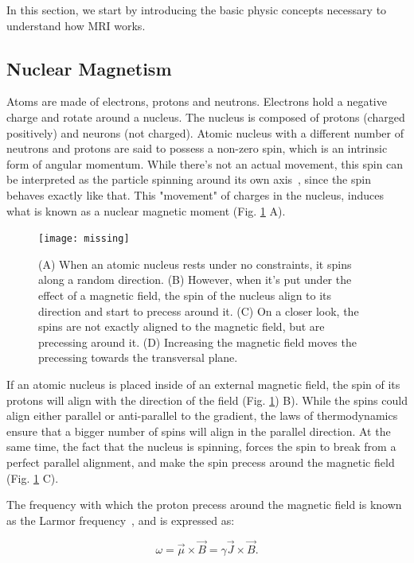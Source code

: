 In this section, we start by introducing the basic physic concepts necessary to
understand how MRI works.

\subsection{Nuclear Magnetism}

Atoms are made of electrons, protons and neutrons. Electrons hold a negative
charge and rotate around a nucleus. The nucleus is composed of protons (charged
positively) and neurons (not charged). Atomic nucleus with a different number of
neutrons and protons are said to possess a non-zero spin, which is an intrinsic
form of angular momentum. While there's not an actual movement, this spin can be
interpreted as the particle spinning around its own axis~\cite{SEGALA1993},
since the spin behaves exactly like that. This "movement" of charges in the nucleus,
induces what is known as a nuclear magnetic moment (Fig. \ref{fig:spin} A).

\begin{figure}[h]
    \texttt{[image: missing]}
    \caption{(A) When an atomic nucleus rests under no constraints, it spins along a
             random direction. (B) However, when it's put under the effect of a
             magnetic field, the spin of the nucleus align to its direction and
             start to precess around it. (C) On a closer look, the spins are
             not exactly aligned to the magnetic field, but are precessing around
             it. (D) Increasing the magnetic field moves the precessing towards
             the transversal plane.}
    \label{fig:spin}
\end{figure} 

If an atomic nucleus is placed inside of an external magnetic field, the spin
of its protons will align with the direction of the field (Fig. \ref{fig:spin}) B).
While the spins could align either parallel or anti-parallel to the gradient,
the laws of thermodynamics ensure that a bigger number of spins will align
in the parallel direction. At the same time, the fact that the nucleus is spinning,
forces the spin to break from a perfect parallel alignment, and make the spin
precess around the magnetic field (Fig. \ref{fig:spin} C).

The frequency with which the proton precess around the magnetic field is known 
as the Larmor frequency~\cite{Larmor1897}, and is expressed as:

\begin{equation}
    \label{eq:larmor}
    \omega = \vec{\mu} \times \vec{B} = \gamma \vec{J} \times \vec{B}.
\end{equation}

